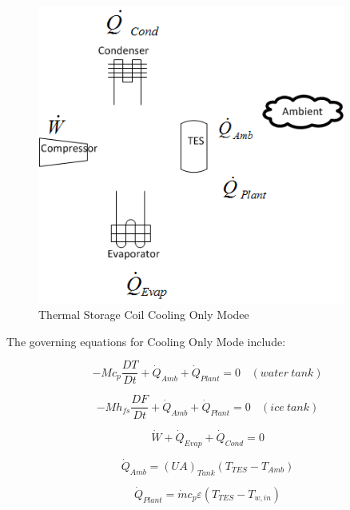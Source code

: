 \begin{figure}[hbtp] %
\centering
\includegraphics[width=0.9\textwidth, height=0.9\textheight, keepaspectratio=true]{media/image4293.png}
\caption{Thermal Storage Coil Cooling Only Modee \protect \label{fig:thermal-storage-coil-cooling-only-modee}}
\end{figure}

The governing equations for Cooling Only Mode include:

\begin{equation}
-M{c_p}\frac{{DT}}{{Dt}} + {\dot Q_{Amb}} + {\dot Q_{Plant}} = 0 ~~~~ (water~tank)
\end{equation}

\begin{equation}
-M{h_{fs}}\frac{{DF}}{{Dt}} + {\dot Q_{Amb}} + {\dot Q_{Plant}} = 0 ~~~~ (ice~tank)
\end{equation}

\begin{equation}
\dot W + {\dot Q_{Evap}} + {\dot Q_{Cond}} = 0
\end{equation}

\begin{equation}
{\dot Q_{Amb}} = {\left( {UA} \right)_{Tank}}\left( {{T_{TES}} - {T_{Amb}}} \right)
\end{equation}

\begin{equation}
{\dot Q_{Plant}} = \dot m{c_p}\varepsilon \left( {{T_{TES}} - {T_{w,in}}} \right)
\end{equation}

